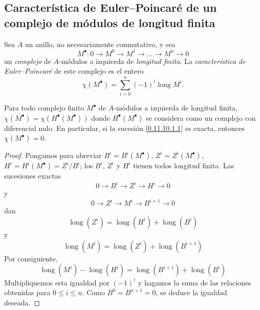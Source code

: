 \subsection{Característica de Euler--Poincar\'e de un complejo de módulos de longitud finita}
\label{subsection:0.11.10}
\label{subsection:0.11.10-fr}

\begin{env}[11.10.1]
\label{0.11.10.1}
\label{0.11.10.1-fr}
Sea $A$ un anillo, no necesariamente conmutativo, y sea
\[
\label{0.11.10.1.1-fr}
\tag{11.10.1.1}
M^\bullet:0\longrightarrow M^0\longrightarrow M^1
\longrightarrow\ldots\longrightarrow M^n\longrightarrow0
\]
un \emph{complejo} de $A$-módulos a izquierda de \emph{longitud finita}.
La \emph{característica de Euler--Poincar\'e} de este complejo es el
entero
\[
\label{0.11.10.1.2-fr}
\tag{11.10.1.2}
\chi(M^\bullet)=\sum_{i=0}^{n}(-1)^i\operatorname{long}M^i.
\]
\end{env}

\begin{proposition}[11.10.2]
\label{0.11.10.2}
\label{0.11.10.2-fr}
Para todo complejo finito $M^\bullet$ de $A$-módulos a izquierda de longitud
finita,
$\chi(M^\bullet)=\chi(H^\bullet(M^\bullet))$
donde $H^\bullet(M^\bullet)$ se considera como un complejo con diferencial
nulo.
En particular, si la sucesión \eqref{0.11.10.1.1} es exacta, entonces
$\chi(M^\bullet)=0$.
\end{proposition}

\begin{proof}
Pongamos para abreviar $B^i=B^i(M^\bullet)$, $Z^i=Z^i(M^\bullet)$, $H^i=H^i(M^\bullet)=Z^i/B^i$; los $B^i$, $Z^i$ y $H^i$ tienen todos
longitud finita.
Las sucesiones exactas
\[
0\longrightarrow B^i\longrightarrow Z^i\longrightarrow H^i
\longrightarrow0
\]
y
\[
0\longrightarrow Z^i\longrightarrow M^i\longrightarrow B^{i+1}
\longrightarrow0
\]
dan
\[
\operatorname{long}(Z^i)=\operatorname{long}(H^i)+
\operatorname{long}(B^i)
\]
y
\[
\operatorname{long}(M^i)=\operatorname{long}(Z^i)+
\operatorname{long}(B^{i+1})
\]
Por consiguiente,
\[
\operatorname{long}(M^i)-\operatorname{long}(H^i)=
\operatorname{long}(B^{i+1})+\operatorname{long}(B^i)
\]
Multipliquemos esta igualdad por $(-1)^i$ y hagamos la suma de las relaciones obtenidas para $0\leq i\leq n$.
Como $B^0=B^{n+1}=0$, se deduce la igualdad deseada.
\end{proof}

